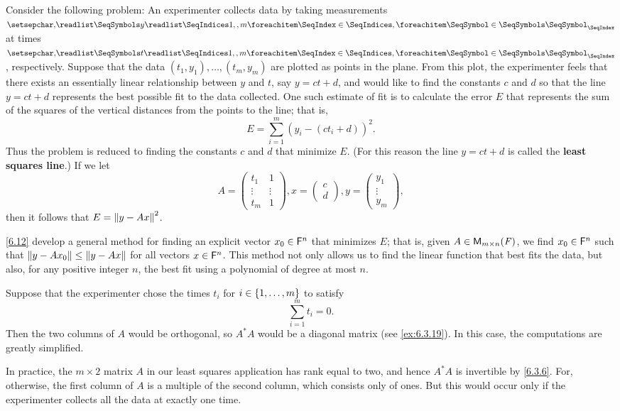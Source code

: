 \begin{note}
	Consider the following problem:
	An experimenter collects data by taking measurements \(\seq{y}{1,,m}\) at times \(\seq{t}{1,,m}\), respectively.
	Suppose that the data \((t_1, y_1), \dots, (t_m, y_m)\) are plotted as points in the plane.
	From this plot, the experimenter feels that there exists an essentially linear relationship between \(y\) and \(t\), say \(y = ct + d\), and would like to find the constants \(c\) and \(d\) so that the line \(y = ct + d\) represents the best possible fit to the data collected.
	One such estimate of fit is to calculate the error \(E\) that represents the sum of the squares of the vertical distances from the points to the line;
	that is,
	\[
		E = \sum_{i = 1}^m (y_i - (c t_i + d))^2.
	\]
	Thus the problem is reduced to finding the constants \(c\) and \(d\) that minimize \(E\).
	(For this reason the line \(y = ct + d\) is called the \textbf{least squares line}.)
	If we let
	\[
		A = \begin{pmatrix}
			t_1    & 1      \\
			\vdots & \vdots \\
			t_m    & 1
		\end{pmatrix}, x = \begin{pmatrix}
			c \\
			d
		\end{pmatrix}, y = \begin{pmatrix}
			y_1    \\
			\vdots \\
			y_m
		\end{pmatrix},
	\]
	then it follows that \(E = \left\lVert y - Ax\right\rVert^2\).

	\cref{6.12} develop a general method for finding an explicit vector \(x_0 \in \mathsf{F}^n\) that minimizes \(E\);
	that is, given \(A \in \ms\), we find \(x_0 \in \mathsf{F}^n\) such that \(\left\lVert y - A x_0\right\rVert \leq \left\lVert y - Ax\right\rVert\) for all vectors \(x \in \mathsf{F}^n\).
	This method not only allows us to find the linear function that best fits the data, but also, for any positive integer \(n\), the best fit using a polynomial of degree at most \(n\).

	Suppose that the experimenter chose the times \(t_i\) for \(i \in \left\lbrace1, \dots, m\right\rbrace\) to satisfy
	\[
		\sum_{i = 1}^m t_i = 0.
	\]
	Then the two columns of \(A\) would be orthogonal, so \(A^* A\) would be a diagonal matrix (see \cref{ex:6.3.19}).
	In this case, the computations are greatly simplified.

	In practice, the \(m \times 2\) matrix \(A\) in our least squares application has rank equal to two, and hence \(A^* A\) is invertible by \cref{6.3.6}.
	For, otherwise, the first column of \(A\) is a multiple of the second column, which consists only of ones.
	But this would occur only if the experimenter collects all the data at exactly one time.


\end{note}
